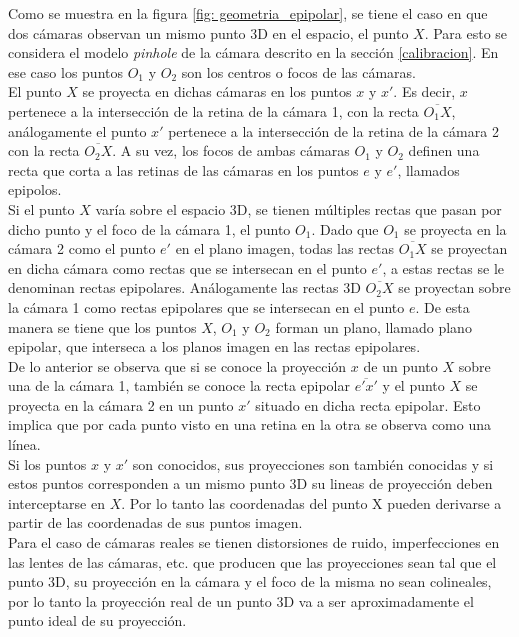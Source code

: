  Como se muestra en la figura \ref{fig: geometria_epipolar}, se tiene el caso en que dos cámaras observan un mismo punto 3D en el espacio, el punto $X$. Para esto se considera el modelo \textit{pinhole} de la cámara  descrito en la sección \ref{calibracion}. En ese caso los puntos $O_1$ y $O_2$ son los centros o focos de las cámaras.\\
 
  El punto $X$ se proyecta en dichas cámaras en los puntos $x$ y $x'$. Es decir, $x$ pertenece a la intersección de la retina de la cámara 1, con la recta $\overline{O_1X}$, análogamente el punto $x'$ pertenece a la intersección de la retina de la cámara 2 con la recta $\overline{O_2X}$. A su vez, los focos de ambas cámaras $O_1$ y $O_2$ definen una recta que corta a las retinas de las cámaras en los puntos $e$ y $e'$, llamados epipolos.\\
  
  Si el punto $X$ varía sobre el espacio 3D, se tienen múltiples rectas que pasan por dicho punto y el foco de la cámara 1, el punto $O_1$. Dado que $O_1$ se proyecta en la cámara 2 como el punto $e'$ en el plano imagen, todas las rectas  $\overline{O_1X}$ se proyectan en dicha cámara como rectas que se intersecan en el punto $e'$, a estas rectas se le denominan rectas epipolares. Análogamente las rectas 3D $\overline{O_2X}$ se proyectan sobre la cámara 1 como rectas epipolares que se intersecan en el punto $e$. De esta manera se tiene que los puntos $X$, $O_1$ y $O_2$ forman un plano, llamado plano epipolar,  que interseca a los planos imagen en las rectas epipolares.\\
  
De lo anterior se observa que si se conoce la proyección $x$ de un punto $X$ sobre una de la cámara 1, también se conoce la recta epipolar $\overline{e'x'}$ y el punto $X$ se proyecta en la cámara 2 en un punto $x'$ situado en dicha recta epipolar. Esto implica que por cada punto visto en una retina en la otra se observa como una línea.\\
 
Si los puntos $x$ y $x'$ son conocidos, sus proyecciones son también conocidas y si estos puntos corresponden a un mismo punto 3D su lineas de proyección deben interceptarse en $X$. Por lo tanto las coordenadas del punto X pueden derivarse a partir de las coordenadas de sus puntos imagen.\\
 
Para el caso de cámaras reales se tienen distorsiones de ruido, imperfecciones en las lentes de las cámaras, etc. que producen que las proyecciones sean tal que el punto 3D, su proyección en la cámara y el foco de la misma no sean colineales, por lo tanto la proyección real de un punto 3D va a ser aproximadamente el punto ideal de su proyección. \\

